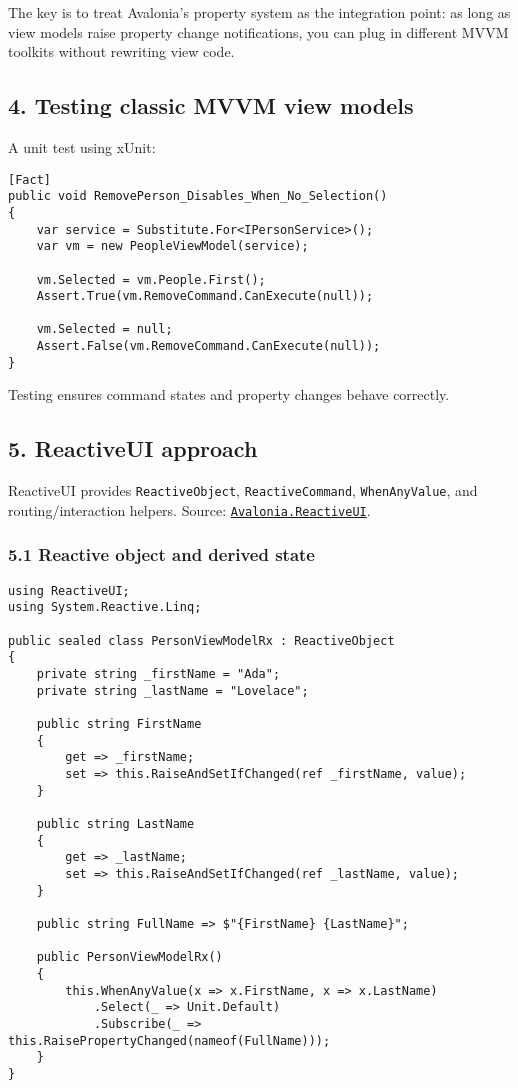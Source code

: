 The key is to treat Avalonia's property system as the integration point:
as long as view models raise property change notifications, you can plug
in different MVVM toolkits without rewriting view code.

\subsection{4. Testing classic MVVM view
models}\label{testing-classic-mvvm-view-models}

A unit test using xUnit:

\begin{lstlisting}
[Fact]
public void RemovePerson_Disables_When_No_Selection()
{
    var service = Substitute.For<IPersonService>();
    var vm = new PeopleViewModel(service);

    vm.Selected = vm.People.First();
    Assert.True(vm.RemoveCommand.CanExecute(null));

    vm.Selected = null;
    Assert.False(vm.RemoveCommand.CanExecute(null));
}
\end{lstlisting}

Testing ensures command states and property changes behave correctly.

\subsection{5. ReactiveUI approach}\label{reactiveui-approach}

ReactiveUI provides \passthrough{\lstinline!ReactiveObject!},
\passthrough{\lstinline!ReactiveCommand!},
\passthrough{\lstinline!WhenAnyValue!}, and routing/interaction helpers.
Source:
\href{https://github.com/AvaloniaUI/Avalonia/tree/master/src/Avalonia.ReactiveUI}{\passthrough{\lstinline!Avalonia.ReactiveUI!}}.

\subsubsection{5.1 Reactive object and derived
state}\label{reactive-object-and-derived-state}

\begin{lstlisting}
using ReactiveUI;
using System.Reactive.Linq;

public sealed class PersonViewModelRx : ReactiveObject
{
    private string _firstName = "Ada";
    private string _lastName = "Lovelace";

    public string FirstName
    {
        get => _firstName;
        set => this.RaiseAndSetIfChanged(ref _firstName, value);
    }

    public string LastName
    {
        get => _lastName;
        set => this.RaiseAndSetIfChanged(ref _lastName, value);
    }

    public string FullName => $"{FirstName} {LastName}";

    public PersonViewModelRx()
    {
        this.WhenAnyValue(x => x.FirstName, x => x.LastName)
            .Select(_ => Unit.Default)
            .Subscribe(_ => this.RaisePropertyChanged(nameof(FullName)));
    }
}
\end{lstlisting}


